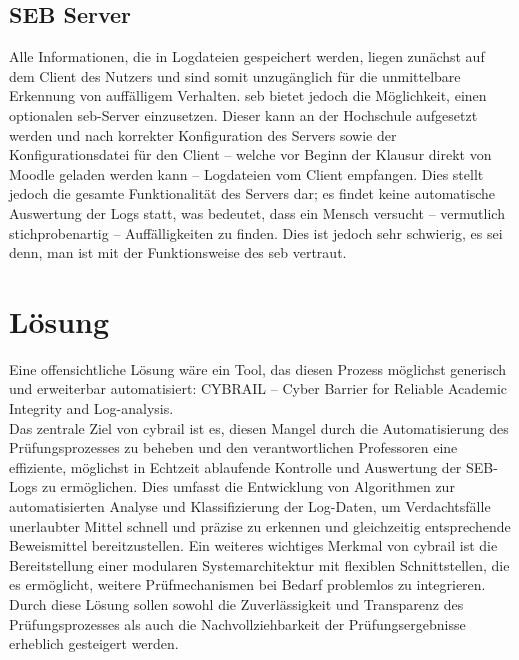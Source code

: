 \subsection{SEB Server}
Alle Informationen, die in Logdateien gespeichert werden, liegen zunächst auf dem Client des Nutzers und sind somit unzugänglich für die unmittelbare Erkennung von auffälligem Verhalten. 
\gls{seb} bietet jedoch die Möglichkeit, einen optionalen \gls{seb}-Server einzusetzen. 
Dieser kann an der Hochschule aufgesetzt werden und nach korrekter Konfiguration des Servers sowie der Konfigurationsdatei für den Client – welche vor Beginn der Klausur direkt von Moodle geladen werden kann – Logdateien vom Client empfangen. 
Dies stellt jedoch die gesamte Funktionalität des Servers dar; 
es findet keine automatische Auswertung der Logs statt, was bedeutet, dass ein Mensch versucht – vermutlich stichprobenartig – Auffälligkeiten zu finden. 
Dies ist jedoch sehr schwierig, es sei denn, man ist mit der Funktionsweise des \gls{seb} vertraut.

\section{Lösung}
Eine offensichtliche Lösung wäre ein Tool, das diesen Prozess möglichst generisch und erweiterbar automatisiert: CYBRAIL – Cyber Barrier for Reliable Academic Integrity and Log-analysis.\\
Das zentrale Ziel von \gls{cybrail} ist es, diesen Mangel durch die Automatisierung des Prüfungsprozesses zu beheben und den verantwortlichen Professoren eine effiziente, möglichst in Echtzeit ablaufende Kontrolle und Auswertung der SEB-Logs zu ermöglichen. Dies umfasst die Entwicklung von Algorithmen zur automatisierten Analyse und Klassifizierung der Log-Daten, um Verdachtsfälle unerlaubter Mittel schnell und präzise zu erkennen und gleichzeitig entsprechende Beweismittel bereitzustellen. Ein weiteres wichtiges Merkmal von \gls{cybrail} ist die Bereitstellung einer modularen Systemarchitektur mit flexiblen Schnittstellen, die es ermöglicht, weitere Prüfmechanismen bei Bedarf problemlos zu integrieren.\\
Durch diese Lösung sollen sowohl die Zuverlässigkeit und Transparenz des Prüfungsprozesses als auch die Nachvollziehbarkeit der Prüfungsergebnisse erheblich gesteigert werden.




